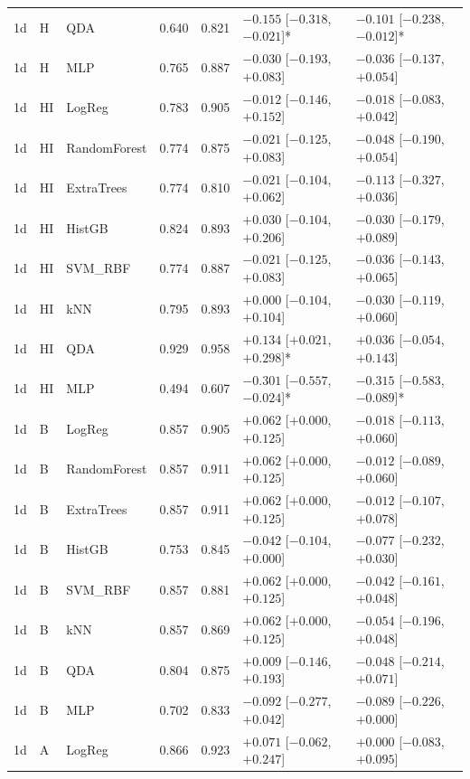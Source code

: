 {\begin{longtable}{@{}lllrrll@{}}
1d & H & QDA & 0.640 & 0.821 & $-0.155$ [$-0.318$, $-0.021$]* & $-0.101$ [$-0.238$, $-0.012$]* \\
1d & H & MLP & 0.765 & 0.887 & $-0.030$ [$-0.193$, $+0.083$] & $-0.036$ [$-0.137$, $+0.054$] \\
1d & HI & LogReg & 0.783 & 0.905 & $-0.012$ [$-0.146$, $+0.152$] & $-0.018$ [$-0.083$, $+0.042$] \\
1d & HI & RandomForest & 0.774 & 0.875 & $-0.021$ [$-0.125$, $+0.083$] & $-0.048$ [$-0.190$, $+0.054$] \\
1d & HI & ExtraTrees & 0.774 & 0.810 & $-0.021$ [$-0.104$, $+0.062$] & $-0.113$ [$-0.327$, $+0.036$] \\
1d & HI & HistGB & 0.824 & 0.893 & $+0.030$ [$-0.104$, $+0.206$] & $-0.030$ [$-0.179$, $+0.089$] \\
1d & HI & SVM\_RBF & 0.774 & 0.887 & $-0.021$ [$-0.125$, $+0.083$] & $-0.036$ [$-0.143$, $+0.065$] \\
1d & HI & kNN & 0.795 & 0.893 & $+0.000$ [$-0.104$, $+0.104$] & $-0.030$ [$-0.119$, $+0.060$] \\
1d & HI & QDA & 0.929 & 0.958 & $+0.134$ [$+0.021$, $+0.298$]* & $+0.036$ [$-0.054$, $+0.143$] \\
1d & HI & MLP & 0.494 & 0.607 & $-0.301$ [$-0.557$, $-0.024$]* & $-0.315$ [$-0.583$, $-0.089$]* \\
1d & B & LogReg & 0.857 & 0.905 & $+0.062$ [$+0.000$, $+0.125$] & $-0.018$ [$-0.113$, $+0.060$] \\
1d & B & RandomForest & 0.857 & 0.911 & $+0.062$ [$+0.000$, $+0.125$] & $-0.012$ [$-0.089$, $+0.060$] \\
1d & B & ExtraTrees & 0.857 & 0.911 & $+0.062$ [$+0.000$, $+0.125$] & $-0.012$ [$-0.107$, $+0.078$] \\
1d & B & HistGB & 0.753 & 0.845 & $-0.042$ [$-0.104$, $+0.000$] & $-0.077$ [$-0.232$, $+0.030$] \\
1d & B & SVM\_RBF & 0.857 & 0.881 & $+0.062$ [$+0.000$, $+0.125$] & $-0.042$ [$-0.161$, $+0.048$] \\
1d & B & kNN & 0.857 & 0.869 & $+0.062$ [$+0.000$, $+0.125$] & $-0.054$ [$-0.196$, $+0.048$] \\
1d & B & QDA & 0.804 & 0.875 & $+0.009$ [$-0.146$, $+0.193$] & $-0.048$ [$-0.214$, $+0.071$] \\
1d & B & MLP & 0.702 & 0.833 & $-0.092$ [$-0.277$, $+0.042$] & $-0.089$ [$-0.226$, $+0.000$] \\
1d & A & LogReg & 0.866 & 0.923 & $+0.071$ [$-0.062$, $+0.247$] & $+0.000$ [$-0.083$, $+0.095$] \\

\end{longtable}}
